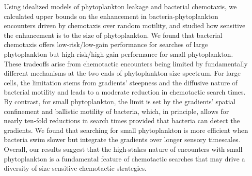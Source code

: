 \documentclass[9pt,twocolumn,twoside]{pnas-new}
\begin{document}
Using idealized models of phytoplankton leakage and bacterial chemotaxis, we calculated upper bounds on the enhancement in bacteria-phytoplankton encounters driven by chemotaxis over random motility, and studied how sensitive the enhancement is to the size of phytoplankton. We found that bacterial chemotaxis offers low-risk/low-gain performance for searches of large phytoplankton but high-risk/high-gain performance for small phytoplankton. These tradeoffs arise from chemotactic encounters being limited by fundamentally different mechanisms at the two ends of phytoplankton size spectrum. For large cells, the limitation stems from gradients' steepness and the diffusive nature of bacterial motility and leads to a moderate reduction in chemotactic search times. By contrast, for small phytoplankton, the limit is set by the gradients' spatial confinement and ballistic motility of bacteria, which, in principle, allows for nearly ten-fold reductions in search times provided that bacteria can detect the gradients. We found that searching for small phytoplankton is more efficient when bacteria swim slower but integrate the gradients over longer sensory timescales. Overall, our results suggest that the high-stakes nature of encounters with small phytoplankton is a fundamental feature of chemotactic searches that may drive a diversity of size-sensitive chemotactic strategies.
\end{document}
